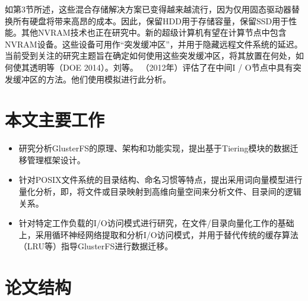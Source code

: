 如第3节所述，这些混合存储解决方案已变得越来越流行，因为仅用固态驱动器替换所有硬盘将带来高昂的成本。因此，保留HDD用于存储容量，保留SSD用于性能。其他NVRAM技术也正在研究中。新的超级计算机有望在计算节点中包含NVRAM设备。这些设备可用作“突发缓冲区”，并用于隐藏远程文件系统的延迟。当前受到关注的研究主题旨在确定如何使用这些突发缓冲区，将其放置在何处，如何使其透明等（DOE 2014）。刘等。 （2012年）评估了在中间I / O节点中具有突发缓冲区的方法。他们使用模拟进行此分析。

\section{本文主要工作}
\begin{itemize}
    \item 研究分析GlusterFS的原理、架构和功能实现，提出基于Tiering模块的数据迁移管理框架设计。
    \item 针对POSIX文件系统的目录结构、命名习惯等特点，提出采用词向量模型进行量化分析，即，将文件或目录映射到高维向量空间来分析文件、目录间的逻辑关系。
    \item 针对特定工作负载的I/O访问模式进行研究，在文件/目录向量化工作的基础上，采用循环神经网络提取和分析I/O访问模式，并用于替代传统的缓存算法（LRU等）指导GlusterFS进行数据迁移。
\end{itemize}
\section{论文结构}